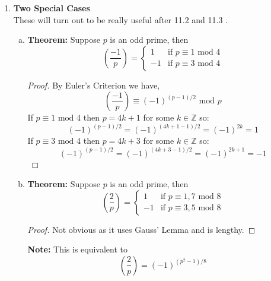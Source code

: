 \documentclass[class=article, crop=false]{standalone}
\def\integers{{\mathbb Z}}
\begin{document}
\begin{enumerate}[1.]
\begin{enumerate}[(a)]
\begin{enumerate}
		\item $\left(\frac{a^2}{p}\right) = 1$
		\begin{proof}
			Obvious.
		\end{proof}
	\end{enumerate}

	\item \textbf{Gauss' Lemma:} Suppose $p$ is an odd prime and $a\in\integers$ with $\gcd(a,p)=1$.
	Let $s$ be the number of least nonnegative residues in the set
	$$\left\{a,2a,\cdots, \left((p-1)/2\right)a\right\}$$ which are $> p/2$.
	Then $\left(\frac{a}{p}\right) = (-1)^s$. \\\\
	\textbf{Ex.} Consider $\left(\frac{8}{13}\right)$. Note that $\left(\frac{p-1}{2}\right) = \frac{12}{2} = 6$
	so look at 
	$$\{8, 2\cdot8, 3\cdot8, \cdots, 6\cdot8\} \equiv \{8,3,11,6,1,9\} \mbox{ mod } 13$$
	Since only three of these are greater than $p/2 = 6.5$ we have $\left(\frac{8}{13}\right) = (-1)^3 = -1$. Thus,
	8 is a quadratic nonresidue mod 13.
\end{enumerate}

	\item \textbf{Two Special Cases}\\
	These will turn out to be really useful after 11.2 and 11.3 .
	\begin{enumerate}[(a)]
		\item \textbf{Theorem:} Suppose $p$ is an odd prime, then
		$$\left(\frac{-1}{p}\right) = \begin{cases}
			1 &\text{if $p\equiv 1\mbox{ mod } 4$} \\
			-1 &\text{if $p\equiv 3\mbox{ mod } 4$}
		\end{cases}$$
		\begin{proof}
			By Euler's Criterion we have,
			$$\left(\frac{-1}{p}\right) \equiv (-1)^{(p-1)/2} \mbox{ mod }p$$
			If $p\equiv 1\mbox{ mod }4$ then $p=4k+1$ for some $k\in\integers$ so:
			$$(-1)^{(p-1)/2} = (-1)^{(4k+1-1)/2} = (-1)^{2k} = 1$$
			If $p\equiv 3\mbox{ mod }4$ then $p=4k+3$ for some $k\in\integers$ so:
			$$(-1)^{(p-1)/2} = (-1)^{(4k+3-1)/2} = (-1)^{2k+1} = -1$$
		\end{proof}

		\item \textbf{Theorem:} Suppose $p$ is an odd prime, then
		$$\left(\frac{2}{p}\right) = \begin{cases}
			1 &\text{if $p\equiv 1,7\mbox{ mod } 8$} \\
			-1 &\text{if $p\equiv 3,5\mbox{ mod } 8$}
		\end{cases}$$
		\begin{proof}
			Not obvious as it uses Gauss' Lemma and is lengthy.
		\end{proof}
		\noindent\textbf{Note:} This is equivalent to
		$$\left(\frac{2}{p}\right) = (-1)^{(p^2 - 1)/8}$$
	\end{enumerate}
\end{enumerate}
\end{document}
